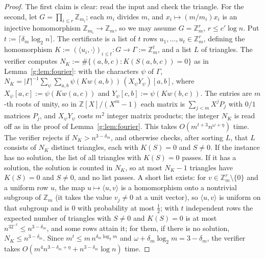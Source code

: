 \documentclass[11pt]{article}
\theoremstyle{definition}
\theoremstyle{remark}
\newcommand{\Z}{\mathbb{Z}}
\begin{document}
\begin{proof}
The first claim is clear: read the input and check the triangle. For the second, let $G=\prod_{i\le r}\Z_{m_i}$; each $m_i$ divides $m$, and $x_i\mapsto(m/m_i)x_i$ is an injective homomorphism $\Z_{m_i}\to\Z_m$, so we may assume $G=\Z_m^r$, $r\le c'\log n$. Put $t:=\lceil\delta_m\log_2n\rceil$. The certificate is a list of $t$ rows $u_1,\dots,u_t\in\Z_m^r$, defining the homomorphism $K:=(\langle u_i,\cdot\rangle)_{i\le t}\colon G\to\Gamma:=\Z_m^t$, and a list $L$ of triangles. The verifier computes $N_K:=\#\{(a,b,c):K(S(a,b,c))=0\}$ as in Lemma~\ref{g:lem:fourier}: with the characters $\psi$ of $\Gamma$, $N_K=|\Gamma|^{-1}\sum_\psi\sum_{a,b}\psi(Kw(a,b))\,(X_\psi Y_\psi)[a,b]$, where $X_\psi[a,c]:=\psi(Kw(a,c))$ and $Y_\psi[c,b]:=\psi(Kw(b,c))$. The entries are $m$-th roots of unity, so in $\Z[X]/(X^m-1)$ each matrix is $\sum_{j<m}X^jP_j$ with $0/1$ matrices $P_j$, and $X_\psi Y_\psi$ costs $m^2$ integer matrix products; the integer $N_K$ is read off as in the proof of Lemma~\ref{g:lem:fourier}. This takes $O(m^{t+3}n^{\omega+\eta})$ time. The verifier rejects if $N_K>n^{3-\delta_m}$, and otherwise checks, after sorting $L$, that $L$ consists of $N_K$ distinct triangles, each with $K(S)=0$ and $S\ne0$. If the instance has no solution, the list of all triangles with $K(S)=0$ passes. If it has a solution, the solution is counted in $N_K$, so at most $N_K-1$ triangles have $K(S)=0$ and $S\ne0$, and no list passes. A short list exists: for $v\in\Z_m^r\setminus\{0\}$ and a uniform row $u$, the map $u\mapsto\langle u,v\rangle$ is a homomorphism onto a nontrivial subgroup of $\Z_m$ (it takes the value $v_j\ne0$ at a unit vector), so $\langle u,v\rangle$ is uniform on that subgroup and is $0$ with probability at most $\frac12$; with $t$ independent rows the expected number of triangles with $S\ne0$ and $K(S)=0$ is at most $n^32^{-t}\le n^{3-\delta_m}$, and some rows attain it; for them, if there is no solution, $N_K\le n^{3-\delta_m}$. Since $m^t\le m\,n^{\delta_m\log_2m}$ and $\omega+\delta_m\log_2m=3-\delta_m$, the verifier takes $O(m^4n^{3-\delta_m+\eta}+n^{3-\delta_m}\log n)$ time.
\end{proof}
\end{document}
